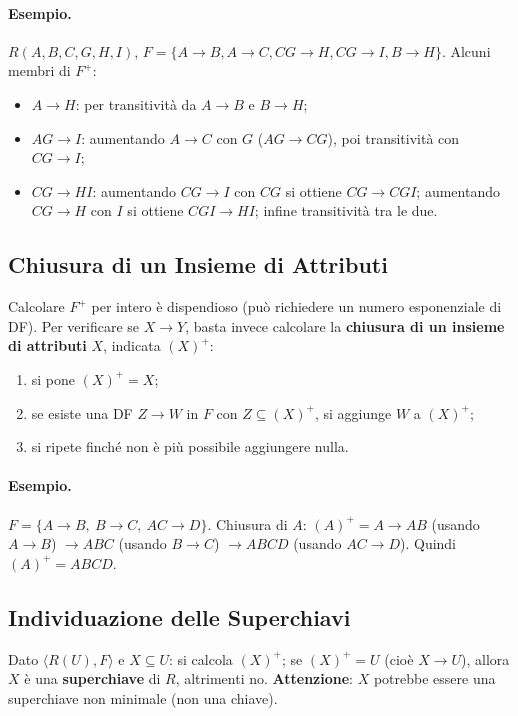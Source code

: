 \documentclass[12pt, a4paper]{article}
\begin{document}
\paragraph{Esempio.} $R(A,B,C,G,H,I)$, $F=\{A\to B, A\to C, CG\to H, CG\to I, B\to H\}$. Alcuni membri di $F^+$:
\begin{itemize}
    \item $A \to H$: per transitività da $A\to B$ e $B \to H$;
    \item $AG \to I$: aumentando $A\to C$ con $G$ ($AG\to CG$), poi transitività con $CG\to I$;
    \item $CG \to HI$: aumentando $CG\to I$ con $CG$ si ottiene $CG \to CGI$; aumentando $CG\to H$ con $I$ si ottiene $CGI \to HI$; infine transitività tra le due.
\end{itemize}

\subsection{Chiusura di un Insieme di Attributi}

Calcolare $F^+$ per intero è dispendioso (può richiedere un numero esponenziale di DF). Per verificare se $X \to Y$, basta invece calcolare la \textbf{chiusura di un insieme di attributi} $X$, indicata $(X)^+$:

\begin{enumerate}
    \item si pone $(X)^+ = X$;
    \item se esiste una DF $Z \to W$ in $F$ con $Z \subseteq (X)^+$, si aggiunge $W$ a $(X)^+$;
    \item si ripete finché non è più possibile aggiungere nulla.
\end{enumerate}

\paragraph{Esempio.} $F = \{A\to B,\ B\to C,\ AC\to D\}$. Chiusura di $A$: $(A)^+=A \to AB$ (usando $A\to B$) $\to ABC$ (usando $B\to C$) $\to ABCD$ (usando $AC\to D$). Quindi $(A)^+=ABCD$.

\subsection{Individuazione delle Superchiavi}

Dato $\langle R(U), F\rangle$ e $X \subseteq U$: si calcola $(X)^+$; se $(X)^+ = U$ (cioè $X \to U$), allora $X$ è una \textbf{superchiave} di $R$, altrimenti no. \textbf{Attenzione}: $X$ potrebbe essere una superchiave non minimale (non una chiave).
\end{document}

